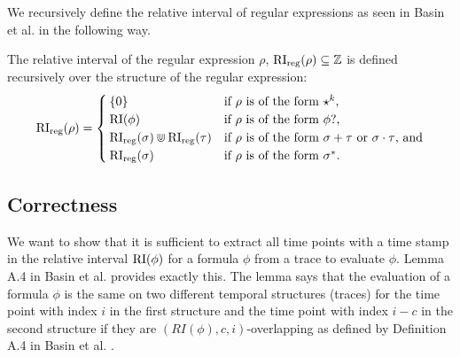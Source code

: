 We recursively define the relative interval of regular expressions as seen in Basin et al. \cite{Basin2020} in the following way.

\begin{definition}
    \label{def:rel-int-reg}
    The relative interval of the regular expression $\rho$, $\operatorname{RI}_{\text{reg}}(\rho) \subseteq \mathbb{Z}$ is defined recursively over the structure of the regular expression:
    \begin{equation*}
        \operatorname{RI}_{\text{reg}}(\rho) =
        \begin{cases}
            \{0\} & \text{if $\rho$ is of the form $\star^k$,} \\
            \operatorname{RI}(\phi) & \text{if $\rho$ is of the form $\phi?$,} \\
            \operatorname{RI}_{\text{reg}}(\sigma) \Cup \operatorname{RI}_{\text{reg}}(\tau) & \text{if $\rho$ is of the form $\sigma + \tau$ or $\sigma \cdot \tau$, and} \\
            \operatorname{RI}_{\text{reg}}(\sigma) & \text{if $\rho$ is of the form $\sigma^*$.}

        \end{cases}
    \end{equation*}
\end{definition}


\subsection{Correctness}
We want to show that it is sufficient to extract all time points with a time stamp in the relative interval $\operatorname{RI}(\phi)$ for a formula $\phi$ from a trace to evaluate $\phi$.
Lemma A.4 in Basin et al. \cite{Basin2016} provides exactly this.
The lemma says that the evaluation of a formula $\phi$ is the same on two different temporal structures (traces) for the time point with index $i$ in the first structure and the time point with index $i-c$ in the second structure if they are $(RI(\phi),c,i)$-overlapping as defined by Definition A.4 in Basin et al. \cite{Basin2016}.

